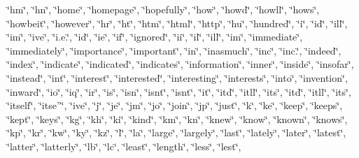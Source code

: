 \char`\"{}hm\char`\"{}, \char`\"{}hn\char`\"{}, \char`\"{}home\char`\"{}, \char`\"{}homepage\char`\"{}, \char`\"{}hopefully\char`\"{}, \char`\"{}how\char`\"{}, \char`\"{}how\textquotesingle{}d\char`\"{}, \char`\"{}how\textquotesingle{}ll\char`\"{}, \char`\"{}how\textquotesingle{}s\char`\"{}, \char`\"{}howbeit\char`\"{}, \char`\"{}however\char`\"{}, \char`\"{}hr\char`\"{}, \char`\"{}ht\char`\"{}, \char`\"{}htm\char`\"{}, \char`\"{}html\char`\"{}, \char`\"{}http\char`\"{}, \char`\"{}hu\char`\"{}, \char`\"{}hundred\char`\"{}, \char`\"{}i\char`\"{}, \char`\"{}i\textquotesingle{}d\char`\"{}, \char`\"{}i\textquotesingle{}ll\char`\"{}, \char`\"{}i\textquotesingle{}m\char`\"{}, \char`\"{}i\textquotesingle{}ve\char`\"{}, \char`\"{}i.\+e.\char`\"{}, \char`\"{}id\char`\"{}, \char`\"{}ie\char`\"{}, \char`\"{}if\char`\"{}, \char`\"{}ignored\char`\"{}, \char`\"{}ii\char`\"{}, \char`\"{}il\char`\"{}, \char`\"{}ill\char`\"{}, \char`\"{}im\char`\"{}, \char`\"{}immediate\char`\"{}, \char`\"{}immediately\char`\"{}, \char`\"{}importance\char`\"{}, \char`\"{}important\char`\"{}, \char`\"{}in\char`\"{}, \char`\"{}inasmuch\char`\"{}, \char`\"{}inc\char`\"{}, \char`\"{}inc.\char`\"{}, \char`\"{}indeed\char`\"{}, \char`\"{}index\char`\"{}, \char`\"{}indicate\char`\"{}, \char`\"{}indicated\char`\"{}, \char`\"{}indicates\char`\"{}, \char`\"{}information\char`\"{}, \char`\"{}inner\char`\"{}, \char`\"{}inside\char`\"{}, \char`\"{}insofar\char`\"{}, \char`\"{}instead\char`\"{}, \char`\"{}int\char`\"{}, \char`\"{}interest\char`\"{}, \char`\"{}interested\char`\"{}, \char`\"{}interesting\char`\"{}, \char`\"{}interests\char`\"{}, \char`\"{}into\char`\"{}, \char`\"{}invention\char`\"{}, \char`\"{}inward\char`\"{}, \char`\"{}io\char`\"{}, \char`\"{}iq\char`\"{}, \char`\"{}ir\char`\"{}, \char`\"{}is\char`\"{}, \char`\"{}isn\char`\"{}, \char`\"{}isn\textquotesingle{}t\char`\"{}, \char`\"{}isnt\char`\"{}, \char`\"{}it\char`\"{}, \char`\"{}it\textquotesingle{}d\char`\"{}, \char`\"{}it\textquotesingle{}ll\char`\"{}, \char`\"{}it\textquotesingle{}s\char`\"{}, \char`\"{}itd\char`\"{}, \char`\"{}itll\char`\"{}, \char`\"{}its\char`\"{}, \char`\"{}itself\char`\"{}, \char`\"{}itse”\char`\"{}, \char`\"{}ive\char`\"{}, \char`\"{}j\char`\"{}, \char`\"{}je\char`\"{}, \char`\"{}jm\char`\"{}, \char`\"{}jo\char`\"{}, \char`\"{}join\char`\"{}, \char`\"{}jp\char`\"{}, \char`\"{}just\char`\"{}, \char`\"{}k\char`\"{}, \char`\"{}ke\char`\"{}, \char`\"{}keep\char`\"{}, \char`\"{}keeps\char`\"{}, \char`\"{}kept\char`\"{}, \char`\"{}keys\char`\"{}, \char`\"{}kg\char`\"{}, \char`\"{}kh\char`\"{}, \char`\"{}ki\char`\"{}, \char`\"{}kind\char`\"{}, \char`\"{}km\char`\"{}, \char`\"{}kn\char`\"{}, \char`\"{}knew\char`\"{}, \char`\"{}know\char`\"{}, \char`\"{}known\char`\"{}, \char`\"{}knows\char`\"{}, \char`\"{}kp\char`\"{}, \char`\"{}kr\char`\"{}, \char`\"{}kw\char`\"{}, \char`\"{}ky\char`\"{}, \char`\"{}kz\char`\"{}, \char`\"{}l\char`\"{}, \char`\"{}la\char`\"{}, \char`\"{}large\char`\"{}, \char`\"{}largely\char`\"{}, \char`\"{}last\char`\"{}, \char`\"{}lately\char`\"{}, \char`\"{}later\char`\"{}, \char`\"{}latest\char`\"{}, \char`\"{}latter\char`\"{}, \char`\"{}latterly\char`\"{}, \char`\"{}lb\char`\"{}, \char`\"{}lc\char`\"{}, \char`\"{}least\char`\"{}, \char`\"{}length\char`\"{}, \char`\"{}less\char`\"{}, \char`\"{}lest\char`\"{}, 